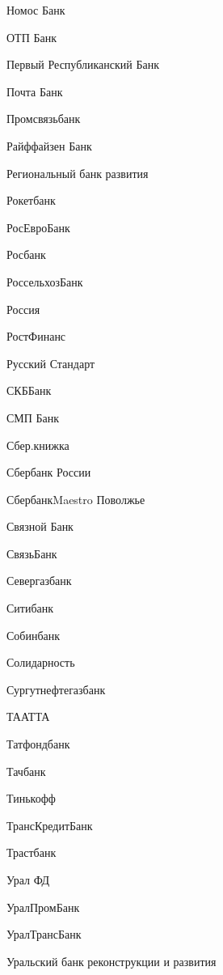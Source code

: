 \documentclass[a4paper,10pt,russian]{sphinxmanual}
\begin{document}
\sphinxAtStartPar
Номос Банк

\sphinxAtStartPar
ОТП Банк

\sphinxAtStartPar
Первый Республиканский Банк

\sphinxAtStartPar
Почта Банк

\sphinxAtStartPar
Промсвязьбанк

\sphinxAtStartPar
Райффайзен Банк

\sphinxAtStartPar
Региональный банк развития

\sphinxAtStartPar
Рокетбанк

\sphinxAtStartPar
РосЕвроБанк

\sphinxAtStartPar
Росбанк

\sphinxAtStartPar
РоссельхозБанк

\sphinxAtStartPar
Россия

\sphinxAtStartPar
РостФинанс

\sphinxAtStartPar
Русский Стандарт

\sphinxAtStartPar
СКБ\sphinxhyphen{}Банк

\sphinxAtStartPar
СМП Банк

\sphinxAtStartPar
Сбер.книжка

\sphinxAtStartPar
Сбербанк России

\sphinxAtStartPar
Сбербанк\sphinxhyphen{}Maestro Поволжье

\sphinxAtStartPar
Связной Банк

\sphinxAtStartPar
Связь\sphinxhyphen{}Банк

\sphinxAtStartPar
Севергазбанк

\sphinxAtStartPar
Ситибанк

\sphinxAtStartPar
Собинбанк

\sphinxAtStartPar
Солидарность

\sphinxAtStartPar
Сургутнефтегазбанк

\sphinxAtStartPar
ТААТТА

\sphinxAtStartPar
Татфондбанк

\sphinxAtStartPar
Тачбанк

\sphinxAtStartPar
Тинькофф

\sphinxAtStartPar
ТрансКредитБанк

\sphinxAtStartPar
Трастбанк

\sphinxAtStartPar
Урал ФД

\sphinxAtStartPar
УралПромБанк

\sphinxAtStartPar
УралТрансБанк

\sphinxAtStartPar
Уральский банк реконструкции и развития
\end{document}
